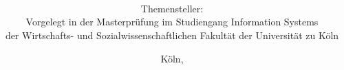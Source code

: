 \title{\large \thesisauthorfirstname{} \thesisauthorlastname}
\author{\LARGE \thesistitle \\ \\ \\
\large \thesistype \\ \\ \\
\normalsize Themensteller: \supervisor \\
\normalsize Vorgelegt in der Masterprüfung im Studiengang Information Systems  \\
\normalsize der Wirtschafts- und Sozialwissenschaftlichen Fakultät der Universität zu Köln
}
\date{\large Köln, \the\year}
